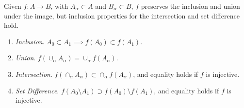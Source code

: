   \begin{theorem}
    \label{thm:preserve_image}
    Given $f: A \rightarrow B$, with $A_\alpha \subset A$ and $B_\alpha \subset B$, $f$ preserves the inclusion and union under the image, but inclusion properties for the intersection and set difference hold. 
    \begin{enumerate}
      \item \textit{Inclusion}. $A_0 \subset A_1 \implies f(A_0) \subset f(A_1)$. 
      \item \textit{Union}. $f(\cup_\alpha A_\alpha) = \cup_\alpha f(A_\alpha)$. 
      \item \textit{Intersection}. $f(\cap_\alpha A_\alpha) \subset \cap_\alpha f(A_\alpha)$, and equality holds if $f$ is injective. 
      \item \textit{Set Difference}. $f(A_0 \setminus A_1) \supset f(A_0) \setminus f(A_1)$, and equality holds if $f$ is injective. 
    \end{enumerate}
  \end{theorem} 
